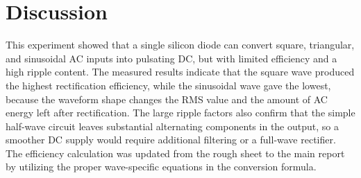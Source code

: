 \section{Discussion}

This experiment showed that a single silicon diode can convert square, triangular,
and sinusoidal AC inputs into pulsating DC, but with limited efficiency and a high
ripple content. The measured results indicate that the square wave produced the highest
rectification efficiency, while the sinusoidal wave gave the lowest, because the waveform
shape changes the RMS value and the amount of AC energy left after rectification. The large
ripple factors also confirm that the simple half-wave circuit leaves substantial alternating
components in the output, so a smoother DC supply would require additional filtering or a
full-wave rectifier. The efficiency calculation was updated from the rough sheet to the main
report by utilizing the proper wave-specific equations in the conversion formula.

